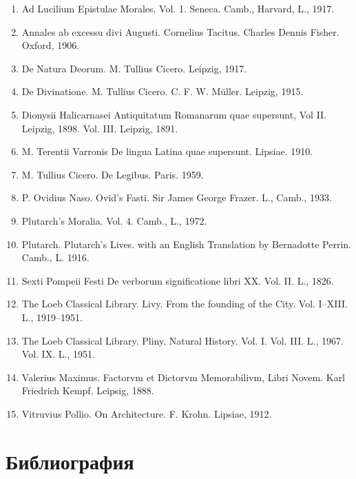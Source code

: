 \begin{flushleft}
\begin{enumerate}
\item Ad Lucilium Epistulae Morales. Vol. 1. Seneca. Camb., Harvard, L., 1917. 

\item Annales ab excessu divi Augusti. Cornelius Tacitus. Charles Dennis Fisher. Oxford, 1906.

\item De Natura Deorum. M. Tullius Cicero. Leipzig, 1917.

\item De Divinatione. M. Tullius Cicero. C. F. W. M\"{u}ller. Leipzig, 1915. 

\item Dionysii Halicarnasei Antiquitatum Romanarum quae supersunt, Vol II. Leipzig, 1898. Vol. III. Leipzig, 1891.

\item M. Terentii Varronis De lingua Latina quae supersunt. Lipsiae. 1910.

\item M. Tullius Cicero. De Legibus. Paris. 1959.

\item P. Ovidius Naso. Ovid's Fasti. Sir James George Frazer. L., Camb., 1933.

\item Plutarch's Moralia. Vol. 4. Camb., L., 1972.

\item Plutarch. Plutarch's Lives. with an English Translation by Bernadotte Perrin. Camb., L. 1916.

\item Sexti Pompeii Festi De verborum significatione libri XX. Vol. II. L., 1826.

\item The Loeb Classical Library. Livy. From the founding of the City. Vol. I--XIII. L., 1919--1951.

\item The Loeb Classical Library. Pliny. Natural History. Vol. I. Vol. III.  L., 1967. Vol. IX. L., 1951.

\item Valerius Maximus. Factorvm et Dictorvm Memorabilivm, Libri Novem. Karl Friedrich Kempf. Leipsig, 1888.

\item Vitruvius Pollio. On Architecture. F. Krohn. Lipsiae, 1912.

\end{enumerate}

\section*{Библиография}


\end{flushleft}
